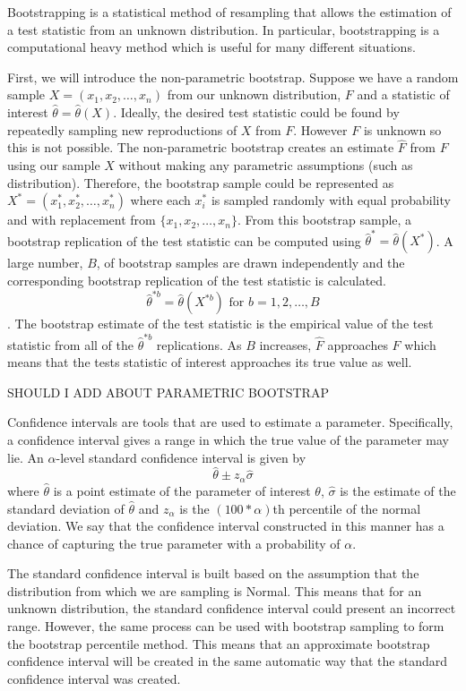 \documentclass[12pt]{article}
\begin{document}
Bootstrapping is a statistical method of resampling that allows the
estimation of a test statistic from an unknown distribution. In
particular, bootstrapping is a computational heavy method which is
useful for many different situations.

First, we will introduce the non-parametric bootstrap. Suppose we have a
random sample \(X = (x_1,x_2,\dots,x_n)\) from our unknown distribution,
\(F\) and a statistic of interest \(\hat{\theta} = \hat{\theta}(X)\).
Ideally, the desired test statistic could be found by repeatedly
sampling new reproductions of \(X\) from \(F\). However \(F\) is unknown
so this is not possible. The non-parametric bootstrap creates an
estimate \(\hat{F}\) from \(F\) using our sample \(X\) without making
any parametric assumptions (such as distribution). Therefore, the
bootstrap sample could be represented as
\(X^* = (x^*_1, x^*_2, \dots, x^*_n)\) where each \(x^*_i\) is sampled
randomly with equal probability and with replacement from
\(\{x_1,x_2,\dots,x_n\}\). From this bootstrap sample, a bootstrap
replication of the test statistic can be computed using
\(\hat{\theta}^* = \hat{\theta}(X^*)\). A large number, \(B\), of
bootstrap samples are drawn independently and the corresponding
bootstrap replication of the test statistic is calculated.
\[\hat{\theta}^{*b} = \hat{\theta}(X^{*b}) \text{ for } b = 1,2, \dots, B\].
The bootstrap estimate of the test statistic is the empirical value of
the test statistic from all of the \(\hat{\theta}^{*b}\) replications.
As \(B\) increases, \(\hat{F}\) approaches \(F\) which means that the
tests statistic of interest approaches its true value as well.

SHOULD I ADD ABOUT PARAMETRIC BOOTSTRAP

Confidence intervals are tools that are used to estimate a parameter.
Specifically, a confidence interval gives a range in which the true
value of the parameter may lie. An \(\alpha\)-level standard confidence
interval is given by \[\hat{\theta} \pm z_{\alpha}\hat{\sigma}\] where
\(\hat{\theta}\) is a point estimate of the parameter of interest
\(\theta\), \(\hat{\sigma}\) is the estimate of the standard deviation
of \(\hat{\theta}\) and \(z_{\alpha}\) is the \((100 *\alpha)\)th
percentile of the normal deviation. We say that the confidence interval
constructed in this manner has a chance of capturing the true parameter
with a probability of \(\alpha\).

The standard confidence interval is built based on the assumption that
the distribution from which we are sampling is Normal. This means that
for an unknown distribution, the standard confidence interval could
present an incorrect range. However, the same process can be used with
bootstrap sampling to form the bootstrap percentile method. This means
that an approximate bootstrap confidence interval will be created in the
same automatic way that the standard confidence interval was created.
\end{document}
